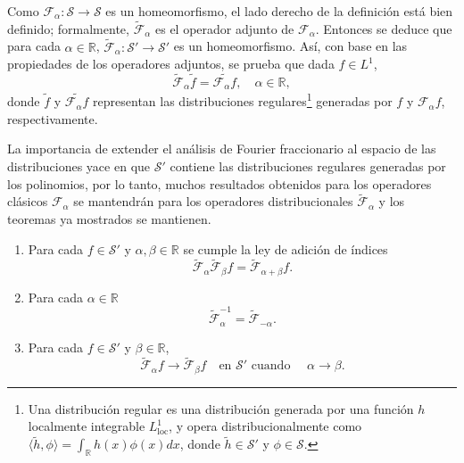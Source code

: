         Como $\mathcal{F}_\alpha: \mathcal{S} \to \mathcal{S}$ es un homeomorfismo, el lado derecho de la definición está bien definido; formalmente, $\tilde{\mathcal{F}}_\alpha$ es el operador adjunto de $\mathcal{F}_\alpha$. Entonces se deduce \citep{kerr1988distributional} que para cada $\alpha \in \mathbb{R}$, $\tilde{\mathcal{F}}_\alpha: \mathcal{S}'\to \mathcal{S}'$ es un homeomorfismo. Así, con base en las propiedades de los operadores adjuntos, se prueba que dada $f \in L^1$,
        \begin{equation*}
            \tilde{\mathcal{F}}_\alpha\tilde{f} = \widetilde{\mathcal{F}_\alpha f},\quad \alpha \in \mathbb{R},
        \end{equation*}
        donde $\tilde{f}$ y $\widetilde{\mathcal{F}_\alpha f}$ representan las distribuciones regulares\footnote{Una distribución regular es una distribución generada por una función $h$ localmente integrable $L^1_{\mathrm{loc}}$, y opera distribucionalmente como $\langle \tilde{h},\phi \rangle = \int_{\mathbb{R}} h(x)\phi(x)dx$, donde $\tilde{h} \in \mathcal{S}'$ y $\phi \in \mathcal{S}$.} generadas por $f$ y $\mathcal{F}_{\alpha}f$, respectivamente.

        La importancia de extender el análisis de Fourier fraccionario al espacio de las distribuciones yace en que $\mathcal{S}'$ contiene las distribuciones regulares generadas por los polinomios, por lo tanto, muchos resultados obtenidos para los operadores clásicos $\mathcal{F}_\alpha$ se mantendrán para los operadores distribucionales $\tilde{\mathcal{F}}_\alpha$ y los teoremas ya mostrados se mantienen.

        \begin{theorem*}
            \begin{enumerate}
                \item Para cada $f \in \mathcal{S}'$ y $\alpha,\beta \in \mathbb{R}$ se cumple la ley de adición de índices
                \begin{equation*}
                    \tilde{\mathcal{F}}_\alpha \tilde{\mathcal{F}}_\beta f = \widetilde{\mathcal{F}}_{\alpha+\beta} f.
                \end{equation*}
                \item Para cada $\alpha \in \mathbb{R}$
                \begin{equation*}
                    \tilde{\mathcal{F}}_\alpha^{-1} = \tilde{\mathcal{F}}_{-\alpha}.
                \end{equation*}
                \item Para cada $f \in \mathcal{S}'$ y $\beta \in \mathbb{R}$,
                \begin{equation*}
                    \tilde{\mathcal{F}}_\alpha f \to \tilde{\mathcal{F}}_\beta f \quad \text{en $\mathcal{S}'$ cuando } \quad \alpha \to \beta.
                \end{equation*}
            \end{enumerate}
        \end{theorem*}

